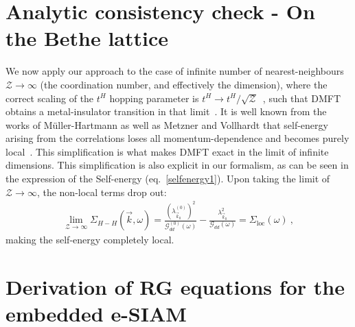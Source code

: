 \documentclass[reprint,hidelinks]{revtex4-2}
\begin{document}
\begin{widetext}
\section{Analytic consistency check - On the Bethe lattice}
We now apply our approach to the case of infinite number of nearest-neighbours $\mathcal{Z}\to\infty$ (the coordination number, and effectively the dimension), where the correct scaling of the $t^{H}$ hopping parameter is $t^{H}\to t^{H}/\sqrt{\mathcal{Z}}$~\cite{metzner_volhardt_1989,georges_kotliar_1992,pruschke_cox_jarrel_1993}, such that DMFT obtains a metal-insulator transition in that limit~\cite{georges1996}. It is well known from the works of Müller-Hartmann as well as Metzner and Vollhardt that self-energy arising from the correlations loses all momentum-dependence and becomes purely local~\cite{Muller-Hartmann1989,metzner_volhardt_1989}. This simplification is what makes DMFT exact in the limit of infinite dimensions. This simplification is also explicit in our formalism, as can be seen in the expression of the Self-energy (eq.~\eqref{selfenergy1}). Upon taking the limit of \(\mathcal{Z}\to\infty\), the non-local terms drop out:
\begin{equation}\begin{aligned}
	\lim_{\mathcal{Z}\to\infty}\Sigma_{H-H}(\vec k,\omega) = \frac{\left(\lambda_{\vec k_0}^{(0)}\right)^2}{\mathcal{G}^{(0)}_{dd}(\omega)} - \frac{\lambda_{\vec k_0}^2}{\mathcal{G}_{dd}(\omega)} = \Sigma_\text{loc}(\omega)~,
\end{aligned}\end{equation}
making the self-energy completely local.

\section{Derivation of RG equations for the embedded e-SIAM}

\end{widetext}
\end{document}
